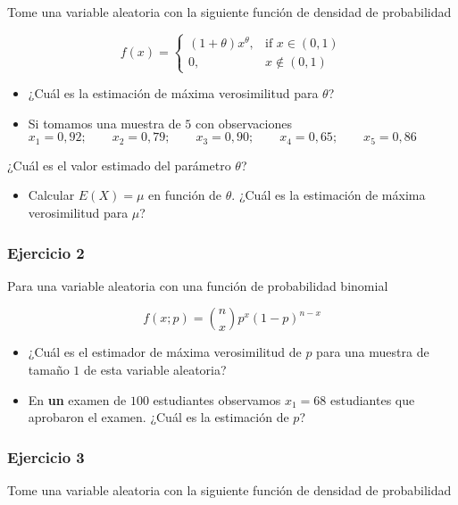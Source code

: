 \documentclass[
]{book}
\providecommand{\tightlist}{%
  \setlength{\itemsep}{0pt}\setlength{\parskip}{0pt}}
\begin{document}
Tome una variable aleatoria con la siguiente función de densidad de probabilidad

\[
f(x)=
\begin{cases}
    (1+\theta)x^\theta,& \text{if } x\in (0,1)\\
    0,&x\notin (0,1)
\end{cases}
\]

\begin{itemize}
\item
  ¿Cuál es la estimación de máxima verosimilitud para \(\theta\)?
\item
  Si tomamos una muestra de \(5\) con observaciones
  \(x_1 = 0,92; \qquad x_2 = 0,79; \qquad x_3 = 0,90; \qquad x_4 = 0,65; \qquad x_5 = 0,86\)
\end{itemize}

¿Cuál es el valor estimado del parámetro \(\theta\)?

\begin{itemize}
\tightlist
\item
  Calcular \(E(X)=\mu\) en función de \(\theta\). ¿Cuál es la estimación de máxima verosimilitud para \(\mu\)?
\end{itemize}

\hypertarget{ejercicio-2-7}{%
\subsubsection{Ejercicio 2}\label{ejercicio-2-7}}

Para una variable aleatoria con una función de probabilidad binomial

\[f(x; p)=\binom n x p^x(1-p)^{n-x}\]

\begin{itemize}
\item
  ¿Cuál es el estimador de máxima verosimilitud de \(p\) para una muestra de tamaño \(1\) de esta variable aleatoria?
\item
  En \textbf{un} examen de \(100\) estudiantes observamos \(x_1=68\) estudiantes que aprobaron el examen. ¿Cuál es la estimación de \(p\)?
\end{itemize}

\hypertarget{ejercicio-3-4}{%
\subsubsection{Ejercicio 3}\label{ejercicio-3-4}}

Tome una variable aleatoria con la siguiente función de densidad de probabilidad
\end{document}
